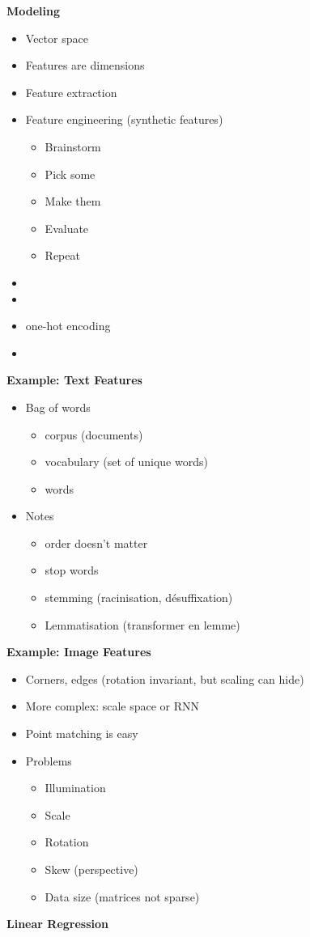 




\textbf{Modeling}
\begin{itemize}
\item Vector space
\item Features are dimensions
\item Feature extraction
\item Feature engineering (synthetic features)
  \begin{itemize}
  \item Brainstorm
  \item Pick some
  \item Make them
  \item Evaluate
  \item Repeat
  \end{itemize}
\item {}
\item {}
\item one-hot encoding
\item {}
\end{itemize}

\textbf{Example: Text Features}
\begin{itemize}
\item Bag of words
  \begin{itemize}
  \item corpus (documents)
  \item vocabulary (set of unique words)
  \item words
  \end{itemize}
\item Notes
  \begin{itemize}
  \item order doesn't matter
  \item stop words
  \item stemming (racinisation, désuffixation)
  \item Lemmatisation (transformer en lemme)
  \end{itemize}
\end{itemize}

\textbf{Example: Image Features}
\begin{itemize}
\item Corners, edges (rotation invariant, but scaling can hide)
\item More complex: scale space or RNN
\item Point matching is easy
\item Problems
  \begin{itemize}
  \item Illumination
  \item Scale
  \item Rotation
  \item Skew (perspective)
  \item Data size (matrices not sparse)
  \end{itemize}

\end{itemize}

\textbf{Linear Regression}



